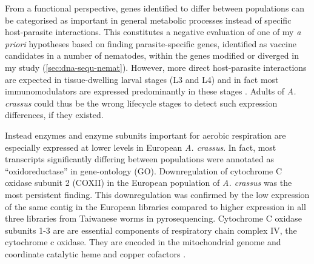 From a functional perspective, genes identified to differ between
populations can be categorised as important in general metabolic
processes instead of specific host-parasite interactions. This
constitutes a negative evaluation of one of my \textit{a priori}
hypotheses based on finding parasite-specific genes, identified as
vaccine candidates in a number of nematodes, within the genes modified
or diverged in my study (\ref{sec:dna-sequ-nemat}). However, more
direct host-parasite interactions are expected in tissue-dwelling
larval stages (L3 and L4) and in fact most immunomodulators are
expressed predominantly in these stages
\cite{maizels_helminth_2004}. Adults of \textit{A. crassus} could thus
be the wrong lifecycle stages to detect such expression differences,
if they existed.


Instead enzymes and enzyme subunits important for aerobic respiration
are especially expressed at lower levels in European
\textit{A. crassus}. In fact, most transcripts significantly differing
between populations were annotated as ``oxidoreductase'' in
gene-ontology (GO). 
Downregulation of cytochrome C oxidase subunit 2 (COXII) in the
European population of \textit{A. crassus} was the most persistent
finding. This downregulation was confirmed by the low expression of
the same contig in the European libraries compared to higher
expression in all three libraries from Taiwanese worms in
pyrosequencing. Cytochrome C oxidase subunits 1-3 are are essential
components of respiratory chain complex IV, the cytochrome c
oxidase. They are encoded in the mitochondrial genome and coordinate
catalytic heme and copper cofactors \cite{pmid18023115}.

